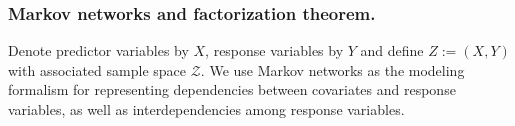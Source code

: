 \documentclass[leqno, a4paper,12pt]{article}
\begin{document}
\subsubsection{Markov networks and factorization theorem.} Denote predictor
variables by $X$, response variables by $Y$ and define $Z := (X,Y)$
with associated sample space $\mathcal{Z}$. We use Markov networks as the modeling formalism for representing dependencies between covariates and 
response variables, as well as interdependencies among response variables.
\end{document}
